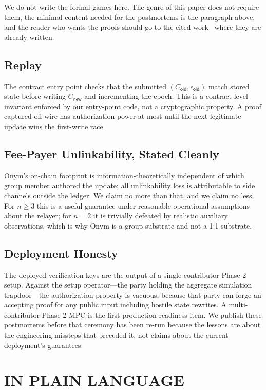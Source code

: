\documentclass{IEEEcsmag}
\newcommand{\Cold}{C_{\mathsf{old}}}
\newcommand{\Cnew}{C_{\mathsf{new}}}
\newcommand{\eold}{\epsilon_{\mathsf{old}}}
\begin{document}
We do not write the formal games here. The genre of this paper does not require them, the minimal content needed for the postmortems is the paragraph above, and the reader who wants the proofs should go to the cited work~\cite{baghery2021,lipmaa2019,fuchsbauer2018agm} where they are already written.

\subsection{Replay}

The contract entry point checks that the submitted $(\Cold, \eold)$ match stored state before writing $\Cnew$ and incrementing the epoch. This is a contract-level invariant enforced by our entry-point code, not a cryptographic property. A proof captured off-wire has authorization power at most until the next legitimate update wins the first-write race.

\subsection{Fee-Payer Unlinkability, Stated Cleanly}

Onym's on-chain footprint is information-theoretically independent of which group member authored the update; all unlinkability loss is attributable to side channels outside the ledger. We claim no more than that, and we claim no less. For $n \geq 3$ this is a useful guarantee under reasonable operational assumptions about the relayer; for $n = 2$ it is trivially defeated by realistic auxiliary observations, which is why Onym is a group substrate and not a 1:1 substrate.

\subsection{Deployment Honesty}

The deployed verification keys are the output of a single-contributor Phase-2 setup. Against the setup operator---the party holding the aggregate simulation trapdoor---the authorization property is vacuous, because that party can forge an accepting proof for any public input including hostile state rewrites. A multi-contributor Phase-2 MPC is the first production-readiness item. We publish these postmortems before that ceremony has been re-run because the lessons are about the engineering missteps that preceded it, not claims about the current deployment's guarantees.


\section{IN PLAIN LANGUAGE}
\end{document}
